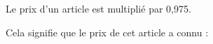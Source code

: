 
Le prix d'un article est multiplié par 0,975.

Cela signifie que le prix de cet article a connu :

\smallskip

